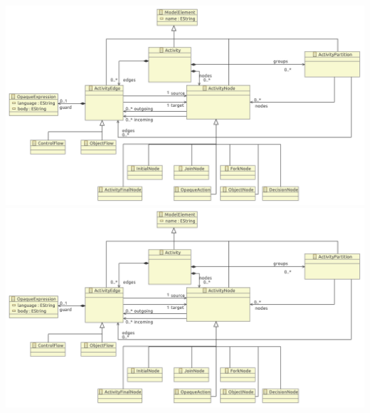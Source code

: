 \documentclass[a4paper,10pt]{article}
\begin{document}
\vspace{1em}
\includegraphics[width=\textwidth]{4/original_minimal_metamodel_4}
\vspace{1em}
\includegraphics[width=\textwidth]{5/original_minimal_metamodel_5}
\end{document}
